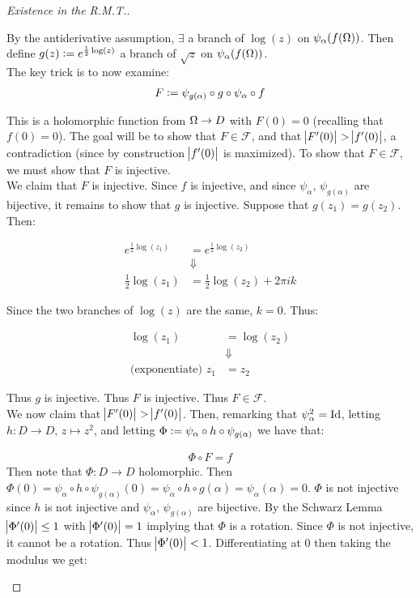 \begin{proof}[Existence in the R.M.T.]
\begin{enumerate}
By the antiderivative assumption, $\exists$ a branch of $\log(z) $ on $\psi_\alpha ( f(\Omega))$. Then define $g ( z) \vcentcolon = e^{\frac{1}{2} \log(z)}$ a branch of $\sqrt{z}$ on $\psi_\alpha ( f(\Omega))$.\\

The key trick is to now examine:
\begin{align*}
    F \vcentcolon = \psi_{g(\alpha)} \circ g \circ \psi_\alpha \circ f
\end{align*}

This is a holomorphic function from $\Omega \to D$ with $F(0) = 0$ (recalling that $f(0) = 0$). The goal will be to show that $F \in \mathscr{F}$, and that $\abs{F'(0)} > \abs{f'(0)}$, a contradiction (since by construction $\abs{f'(0)}$ is maximized). To show that $F\in \mathscr{F}$, we must show that $F$ is injective.\\

We claim that $F$ is injective. Since $f$ is injective, and since $\psi_\alpha, \, \psi_{g(\alpha)}$ are bijective, it remains to show that $g$ is injective. Suppose that $g(z_1) = g(z_2)$. Then:

\begin{align*}
    e^{\frac{1}{2} \log(z_1)} &= e^{\frac{1}{2} \log(z_2)}\\
    &\Downarrow\\
    \frac{1}{2} \log(z_1) &= \frac{1}{2}\log(z_2) + 2 \pi i k
\end{align*}

Since the two branches of $\log(z)$ are the same, $k=0$. Thus:

\begin{align*}
    \log(z_1) &= \log(z_2)\\
    &\Downarrow\\
    \text{(exponentiate) } z_1 &= z_2
\end{align*}

Thus $g$ is injective. Thus $F$ is injective. Thus $F \in \mathscr{F}$.\\

We now claim that $\abs{F'(0)} > \abs{f'(0)}$. Then, remarking that $\psi_\alpha^2 = \mathrm{Id}$, letting $h: D \to D, \, z \mapsto z^2$, and letting $\Phi \vcentcolon = \psi_\alpha \circ h \circ \psi_{g(\alpha)}$ we have that:

\begin{align*}
    \Phi \circ F =   f
\end{align*}
 Then note that $\Phi: D \to D$ holomorphic. Then $\Phi ( 0) = \psi_\alpha \circ h \circ \psi_{g(\alpha)} (0) = \psi_\alpha \circ h \circ g(\alpha) = \psi_\alpha (\alpha) = 0$. $\Phi$ is not injective since $h$ is not injective and $\psi_\alpha, \, \psi_{g(\alpha)}$ are bijective. By the Schwarz Lemma $\abs{\Phi ' (0) } \leq 1$ with $\abs{\Phi ' (0) } = 1$ implying that $\Phi$ is a rotation. Since $\Phi$ is not injective, it cannot be a rotation. Thus $\abs{\Phi ' (0) } < 1$. Differentiating at $0$ then taking the modulus we get:
 

\end{enumerate}
\end{proof}
